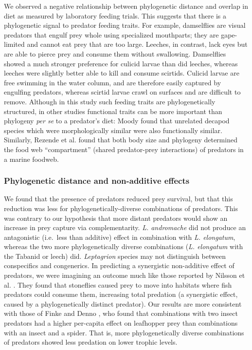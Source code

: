 We observed a negative relationship between phylogenetic distance and
overlap in diet as measured by laboratory feeding trials. This suggests
that there is a phylogenetic signal to predator feeding traits. For
example, damselflies are visual predators that engulf prey whole using
specialized mouthparts; they are gape-limited and cannot eat prey that
are too large. Leeches, in contrast, lack eyes but are able to pierce
prey and consume them without swallowing. Damselflies showed a much
stronger preference for culicid larvae than did leeches, whereas leeches
were slightly better able to kill and consume scirtids. Culicid larvae
are free swimming in the water column, and are therefore easily captured
by engulfing predators, whereas scirtid larvae crawl on surfaces and are
difficult to remove. Although in this study such feeding traits are
phylogenetically structured, in other studies functional traits can be
more important than phylogeny \emph{per se} to a predator's diet: Moody
\citeyearpar{Moody1993} found that unrelated decapod species which were
morphologically similar were also functionally similar. Similarly,
Rezende et al. \citeyearpar{Rezende2009} found that both body size and
phylogeny determined the food web ``compartment'' (shared predator-prey
interactions) of predators in a marine foodweb.

\subsubsection{Phylogenetic distance and non-additive
effects}\label{phylogenetic-distance-and-non-additive-effects}

We found that the presence of predators reduced prey survival, but that
this reduction was less for phylogenetically-diverse combinations of
predators. This was contrary to our hypothesis that more distant
predators would show an increase in prey capture via complementarity.
\emph{L. andromache} did not produce an antagonistic (i.e.~less than
additive) effect in combination with \emph{L. elongatum}, whereas the
two more phylogenetically diverse combinations (\emph{L. elongatum} with
the Tabanid or leech) did. \emph{Leptagrion} species may not distinguish
between conspecifics and congenerics. In predicting a synergistic
non-additive effect of predators, we were imagining an outcome much like
those reported by Nilsson et al. \citeyearpar{Nilsson2006c}. They found
that stoneflies caused prey to move into habitats where fish predators
could consume them, increasing total predation (a synergistic effect,
caused by a phylogenetically distinct predator). Our results are more
consistent with those of Finke and Denno \citeyearpar{Finke2005}, who
found that combinations with two insect predators had a higher
per-capita effect on leafhopper prey than combinations with an insect
and a spider. That is, more phylogenetically diverse combinations of
predators showed less predation on lower trophic levels.

